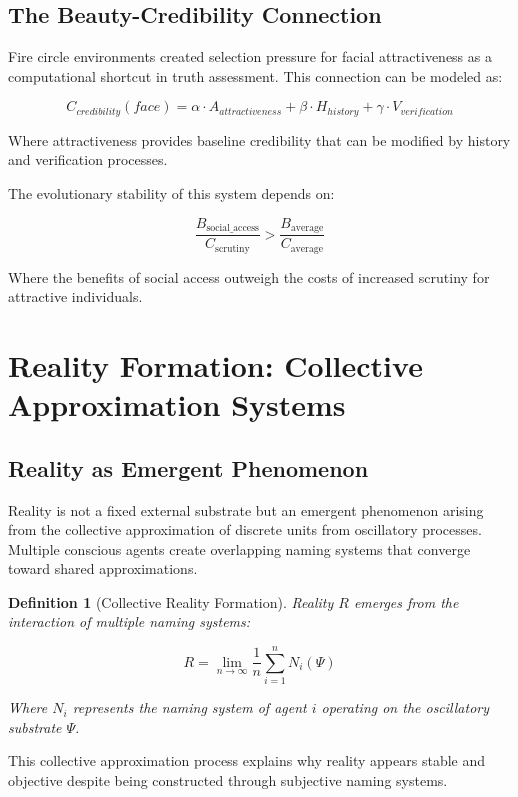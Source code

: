 \documentclass[12pt]{article}
\newtheorem{definition}{Definition}
\begin{document}
\subsection{The Beauty-Credibility Connection}

Fire circle environments created selection pressure for facial attractiveness as a computational shortcut in truth assessment. This connection can be modeled as:

$$C_{credibility}(face) = \alpha \cdot A_{attractiveness} + \beta \cdot H_{history} + \gamma \cdot V_{verification}$$

Where attractiveness provides baseline credibility that can be modified by history and verification processes.

The evolutionary stability of this system depends on:

$$\frac{B_{\text{social\_access}}}{C_{\text{scrutiny}}} > \frac{B_{\text{average}}}{C_{\text{average}}}$$

Where the benefits of social access outweigh the costs of increased scrutiny for attractive individuals.

\section{Reality Formation: Collective Approximation Systems}

\subsection{Reality as Emergent Phenomenon}

Reality is not a fixed external substrate but an emergent phenomenon arising from the collective approximation of discrete units from oscillatory processes. Multiple conscious agents create overlapping naming systems that converge toward shared approximations.

\begin{definition}[Collective Reality Formation]
Reality $R$ emerges from the interaction of multiple naming systems:

$$R = \lim_{n \to \infty} \frac{1}{n} \sum_{i=1}^{n} N_i(\Psi)$$

Where $N_i$ represents the naming system of agent $i$ operating on the oscillatory substrate $\Psi$.
\end{definition}

This collective approximation process explains why reality appears stable and objective despite being constructed through subjective naming systems.
\end{document}
